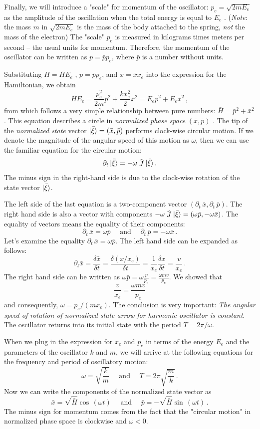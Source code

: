 Finally,  we will introduce a "scale" for momentum of the oscillator: $p_e=\sqrt{2mE_e}$ as the amplitude of the oscillation when the total energy is equal to $E_e$ . (\emph{Note}: the mass $m$  in $\sqrt{2mE_e}$ is the mass of the body attached to the spring, \emph{not} the mass of the electron) The "scale" $p_e$  is measured in kilograms times meters per second -- the usual units for momentum. Therefore, the momentum of the oscillator can be written as $p=\bar{p}p_e$, where $\bar{p}$ is a number without units. 

Substituting $H=\bar{H}E_e$ , $p=\bar{p}p_e$, and $x=\bar{x}x_e$  into the expression for the Hamiltonian, we obtain
\[
\bar{H}E_e=\frac{p_e^2}{2m}\bar{p}^2+\frac{kx_e^2}{2}\bar{x}^2=E_e\bar{p}^2+E_e\bar{x}^2\,,
\]
from which follows a very simple relationship between pure numbers: $\bar{H}=\bar{p}^2+\bar{x}^2$. This equation describes a circle in \emph{normalized phase space} $(\bar{x}, \bar{p})$ . The tip of the \emph{normalized state} vector $|{\bar{\xi}}\rangle=(\bar{x}, \bar{p})$ performs clock-wise circular motion. If we denote the magnitude of the angular speed of this motion as $\omega$, then we can use the familiar equation for the circular motion:
\[
\partial_t\,\ket{\bar{\xi}} = -\omega\op{J}\ket{\bar{\xi}}\,.
\]
The minus sign in the right-hand side is due to the clock-wise rotation of the state vector $|{\bar{\xi}}\rangle$.

The left side of the last equation is a two-component vector $(\partial_t\,\bar{x}, \partial_t\,\bar{p})$. The right hand side is also a vector with components $-\omega\op{J}\ket{\bar{\xi}}=(\omega\bar{p}, -\omega\bar{x})$. The equality of vectors means the equality of their components: 
\[
\partial_t\,\bar{x}=\omega\bar{p}\quad\textrm{ and }\quad\partial_t\,\bar{p}=-\omega\bar{x}\,.
\]
Let’s examine the equality $\partial_t\,\bar{x}=\omega\bar{p}$. The left hand side can be expanded as follows: 
\[
\partial_t \bar{x}=\frac{\delta \bar{x}}{\delta t}=\frac{\delta (x/x_e)}{\delta t}=\frac{1}{x_e}\frac{\delta x}{\delta t}=\frac{v}{x_e}\,.
\]
The right hand side can be written as $\omega \bar{p}=\omega\frac{p}{p_e}=\frac{\omega m v}{p_e}$. We showed that 
\[
\frac{v}{x_e}=\frac{\omega m v}{p_e}
\]
and consequently, $\omega = p_e/(mx_e)$. The conclusion is very important: \emph{The angular speed of rotation of normalized state arrow  for harmonic oscillator is constant}. The oscillator returns into its initial state with the period $T=2\pi/\omega$.

When we plug in the expression for $x_e$ and $p_e$ in terms of the energy $E_e$ and the parameters of the oscillator $k$ and $m$, we will arrive at the following equations for the frequency and period of oscillatory motion:
\[
\omega=\sqrt{\frac{k}{m}}\quad\textrm{ and }\quad T=2\pi\sqrt{\frac{m}{k}}\,.
\]
Now we can write the components of the normalized state vector as
\[
\bar{x}=\sqrt{\bar{H}}\cos\,(\omega t)\quad\textrm{ and }\quad \bar{p}=-\sqrt{\bar{H}}\sin\,(\omega t)\,.
\]
The minus sign for momentum comes from the fact that the "circular motion" in normalized phase space is clockwise and $\omega < 0$.

